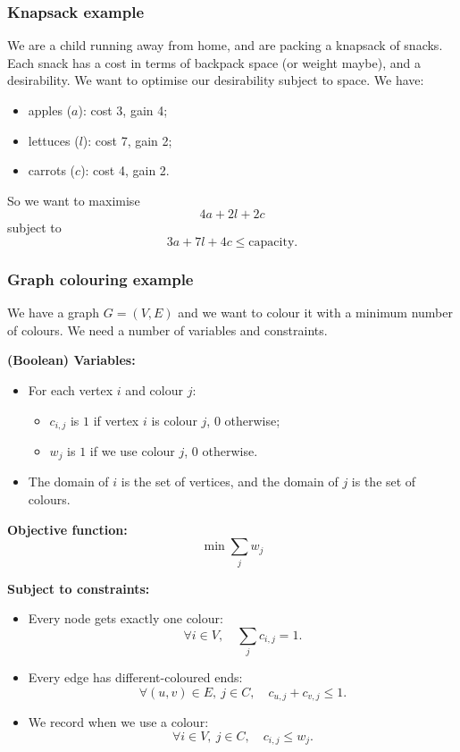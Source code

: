 \documentclass[11pt]{article}
\begin{document}
\subsubsection{Knapsack example}

We are a child running away from home, and are packing a knapsack of snacks. Each snack has a cost in terms of backpack space (or weight maybe), and a desirability. We want to optimise our desirability subject to space. We have:
\begin{itemize}
    \item apples ($a$): cost 3, gain 4;
    \item lettuces ($l$): cost 7, gain 2;
    \item carrots ($c$): cost 4, gain 2.
\end{itemize}

So we want to maximise
\[
    4a + 2l + 2c
\]
subject to
\[
    3a + 7l + 4c \leq \text{capacity}.
\]

\subsubsection{Graph colouring example}

We have a graph $G = (V, E)$ and we want to colour it with a minimum number of colours. We need a number of variables and constraints.

\textbf{(Boolean) Variables:}
\begin{itemize}
    \item For each vertex $i$ and colour $j$:
    \begin{itemize}
        \item $c_{i,j}$ is $1$ if vertex $i$ is colour $j$, $0$ otherwise;
        \item $w_j$ is $1$ if we use colour $j$, $0$ otherwise.
    \end{itemize}
    \item The domain of $i$ is the set of vertices, and the domain of $j$ is the set of colours.
\end{itemize}

\textbf{Objective function:}
\[
    \min \sum_{j} w_j
\]

\textbf{Subject to constraints:}
\begin{itemize}
    \item Every node gets exactly one colour:
    \[
        \forall i \in V,\quad \sum_{j} c_{i,j} = 1.
    \]
    \item Every edge has different-coloured ends:
    \[
        \forall (u, v) \in E,\ j \in C,\quad c_{u,j} + c_{v,j} \leq 1.
    \]
    \item We record when we use a colour:
    \[
        \forall i \in V,\ j \in C,\quad c_{i,j} \leq w_j.
    \]
\end{itemize}
\end{document}
